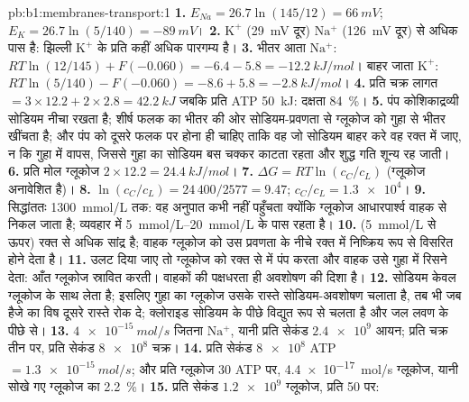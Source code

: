 \begin{solution}{pb:b1:membranes-transport:1}
\textbf{1.} $E_{Na} = 26.7\ln(145/12) = \qty{+66}{mV}$; $E_K =
26.7\ln(5/140) = \qty{-89}{mV}$।
\textbf{2.} $\mathrm{K^+}$ (\qty{29}{mV} दूर) $\mathrm{Na^+}$
(\qty{126}{mV} दूर) से अधिक पास है: झिल्ली $\mathrm{K^+}$ के प्रति कहीं
अधिक पारगम्य है।
\textbf{3.} भीतर आता $\mathrm{Na^+}$: $RT\ln(12/145) + F(-0.060) = -6.4 -
5.8 = \qty{-12.2}{kJ/mol}$। बाहर जाता $\mathrm{K^+}$: $RT\ln(5/140) -
F(-0.060) = -8.6 + 5.8 = \qty{-2.8}{kJ/mol}$।
\textbf{4.} प्रति चक्र लागत $= 3\times 12.2 + 2\times 2.8 = \qty{42.2}{kJ}$
जबकि प्रति ATP \qty{50}{kJ}: दक्षता \qty{84}{\%}।
\textbf{5.} पंप कोशिकाद्रव्यी सोडियम नीचा रखता है; शीर्ष फलक का 
भीतर की ओर सोडियम-प्रवणता से ग्लूकोज को गुहा से भीतर खींचता है; और पंप को
दूसरे फलक पर होना ही चाहिए ताकि वह जो सोडियम बाहर करे वह रक्त में जाए, न
कि गुहा में वापस, जिससे गुहा का सोडियम बस चक्कर काटता रहता और शुद्ध
गति शून्य रह जाती।
\textbf{6.} प्रति मोल ग्लूकोज $2\times 12.2 = \qty{24.4}{kJ/mol}$।
\textbf{7.} $\Delta G = RT\ln(c_C/c_L)$ (ग्लूकोज अनावेशित है)।
\textbf{8.} $\ln(c_C/c_L) = 24\,400/2577 = 9.47$; $c_C/c_L =
\num{1.3e4}$।
\textbf{9.} सिद्धांततः \qty{1300}{mmol/L} तक: वह अनुपात कभी नहीं
पहुँचता क्योंकि ग्लूकोज आधारपार्श्व वाहक से निकल जाता है; व्यवहार में
 \qtyrange{5}{20}{mmol/L} के पास रहता है।
\textbf{10.}  (\qty{5}{mmol/L} से ऊपर) रक्त से अधिक सांद्र
है; वाहक ग्लूकोज को उस प्रवणता के नीचे रक्त में निष्क्रिय रूप से विसरित
होने देता है।
\textbf{11.} उलट दिया जाए तो  ग्लूकोज को रक्त से  में पंप
करता और वाहक उसे गुहा में रिसने देता: आँत ग्लूकोज स्रावित करती।
वाहकों की पक्षधरता ही अवशोषण की दिशा है।
\textbf{12.}  सोडियम केवल ग्लूकोज के साथ लेता है; इसलिए गुहा का
ग्लूकोज उसके रास्ते सोडियम-अवशोषण चलाता है, तब भी जब हैजे का विष दूसरे
रास्ते रोक दे; क्लोराइड सोडियम के पीछे विद्युत रूप से चलता है और जल लवण
के पीछे  से।
\textbf{13.} $\qty{4e-15}{mol/s}$ जितना $\mathrm{Na^+}$, यानी
प्रति सेकंड $\num{2.4e9}$ आयन; प्रति चक्र तीन पर, प्रति सेकंड $\num{8e8}$
चक्र।
\textbf{14.} प्रति सेकंड $\num{8e8}$ ATP $= \qty{1.3e-15}{mol/s}$; और
प्रति ग्लूकोज 30 ATP पर, \qty{4.4e-17}{mol/s} ग्लूकोज, यानी सोखे गए
ग्लूकोज का \qty{2.2}{\%}।
\textbf{15.} प्रति सेकंड $\num{1.2e9}$ ग्लूकोज, प्रति  50 पर:

\end{solution}
